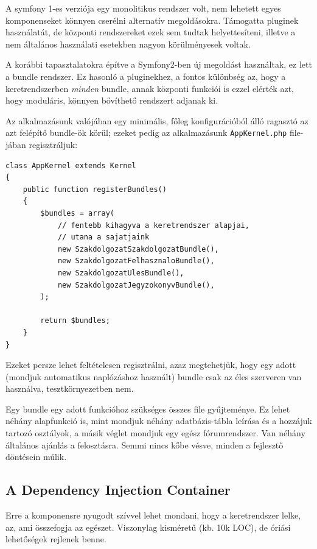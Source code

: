 \documentclass[a4paper,12pt,oneside]{report}
\begin{document}
A symfony 1-es verziója egy monolitikus rendszer volt, nem lehetett egyes komponenseket könnyen cserélni alternatív megoldásokra. Támogatta pluginek használatát, de központi rendszereket ezek sem tudtak helyettesíteni, illetve a nem általános használati esetekben nagyon körülményesek voltak.

A korábbi tapasztalatokra építve a Symfony2-ben új megoldást használtak, ez lett a bundle rendszer\cite{website:symfony2_bundle}. Ez hasonló a pluginekhez, a fontos különbség az, hogy a keretrendszerben \emph{minden} bundle, annak központi funkciói is \textendash{} ezzel elérték azt, hogy moduláris, könnyen bővíthető rendszert adjanak ki.

Az alkalmazásunk valójában egy minimális, főleg konfigurációból álló ragasztó az azt felépítő bundle-ök körül; ezeket pedig az alkalmazásunk \texttt{AppKernel.php} file-jában regisztráljuk:

\begin{lstlisting}
class AppKernel extends Kernel
{
    public function registerBundles()
    {
        $bundles = array(
            // fentebb kihagyva a keretrendszer alapjai,
            // utana a sajatjaink
            new SzakdolgozatSzakdolgozatBundle(),
            new SzakdolgozatFelhasznaloBundle(),
            new SzakdolgozatUlesBundle(),
            new SzakdolgozatJegyzokonyvBundle(),
        );

        return $bundles;
    }
}

\end{lstlisting}

Ezeket persze lehet feltételesen regisztrálni, azaz megtehetjük, hogy egy adott (mondjuk automatikus naplózáshoz használt) bundle csak az éles szerveren van használva, tesztkörnyezetben nem.

Egy bundle egy adott funkcióhoz szükséges összes file gyűjteménye. Ez lehet néhány alapfunkció is, mint mondjuk néhány adatbázis-tábla leírása és a hozzájuk tartozó osztályok, a másik véglet mondjuk egy egész fórumrendszer. Van néhány általános ajánlás a felosztásra. Semmi nincs kőbe vésve, minden a fejlesztő döntésein múlik.

\subsection*{A Dependency Injection Container}

Erre a komponensre nyugodt szívvel lehet mondani, hogy a keretrendszer lelke, az, ami összefogja az egészet. Viszonylag kisméretű (kb. 10k LOC), de óriási lehetőségek rejlenek benne.
\end{document}
